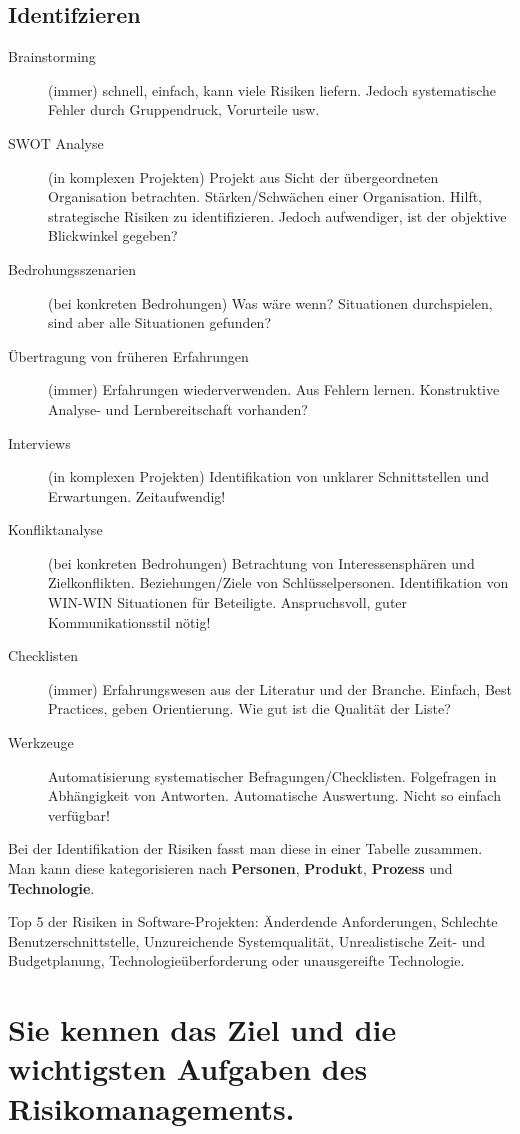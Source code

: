 \subsection{Identifzieren}
\begin{description}
	\item[Brainstorming] (immer) schnell, einfach, kann viele Risiken liefern. Jedoch systematische Fehler durch Gruppendruck, Vorurteile usw.
	\item[SWOT Analyse] (in komplexen Projekten) Projekt aus Sicht der übergeordneten Organisation betrachten. Stärken/Schwächen einer Organisation. Hilft, strategische Risiken zu identifizieren. Jedoch aufwendiger, ist der objektive Blickwinkel gegeben?
	\item[Bedrohungsszenarien] (bei konkreten Bedrohungen) Was wäre wenn? Situationen durchspielen, sind aber alle Situationen gefunden?
	\item[Übertragung von früheren Erfahrungen] (immer) Erfahrungen wiederverwenden. Aus Fehlern lernen. Konstruktive Analyse- und Lernbereitschaft vorhanden?
	\item[Interviews] (in komplexen Projekten) Identifikation von unklarer Schnittstellen und Erwartungen. Zeitaufwendig!
	\item[Konfliktanalyse] (bei konkreten Bedrohungen) Betrachtung von Interessensphären und Zielkonflikten. Beziehungen/Ziele von Schlüsselpersonen. Identifikation von WIN-WIN Situationen für Beteiligte. Anspruchsvoll, guter Kommunikationsstil nötig!
	\item[Checklisten] (immer) Erfahrungswesen aus der Literatur und der Branche. Einfach, Best Practices, geben Orientierung. Wie gut ist die Qualität der Liste?
	\item[Werkzeuge] Automatisierung systematischer Befragungen/Checklisten. Folgefragen in Abhängigkeit von Antworten. Automatische Auswertung. Nicht so einfach verfügbar!
\end{description}

Bei der Identifikation der Risiken fasst man diese in einer Tabelle zusammen. Man kann diese kategorisieren nach \textbf{Personen}, \textbf{Produkt},  \textbf{Prozess} und \textbf{Technologie}.

Top 5 der Risiken in Software-Projekten: Änderdende Anforderungen, Schlechte Benutzerschnittstelle, Unzureichende Systemqualität, Unrealistische Zeit-  und Budgetplanung, Technologieüberforderung oder unausgereifte Technologie.
	
\section{Sie kennen das Ziel und die wichtigsten Aufgaben des Risikomanagements.}

